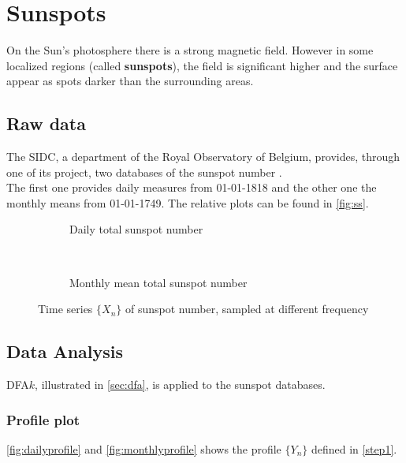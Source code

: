 \graphicspath{{../sunSpots/img/}}
\section{Sunspots}
On the Sun's photosphere there is a strong magnetic field. However in some localized regions (called \textbf{sunspots}), the field is significant higher and the surface appear as spots darker than the surrounding areas.

\subsection{Raw data}
The SIDC, a department of the Royal Observatory of Belgium, provides, through one of its project, two databases of the sunspot number \cite{sidc}. \\
The first one provides daily measures from 01-01-1818 and the other one the monthly means from 01-01-1749. The relative plots can be found in \autoref{fig:ss}.
\begin{figure}[!h]
	\centering
	\begin{subfigure}{0.48\textwidth}
		
		\caption{Daily total sunspot number}\label{fig:dailyss}
	\end{subfigure}
	~
	\begin{subfigure}{0.48\textwidth}
		
		\caption{Monthly mean total sunspot number}\label{fig:monthlyss}
	\end{subfigure}
\caption{Time series $\{X_n\}$ of sunspot number, sampled at different frequency}\label{fig:ss}
\end{figure}

\subsection{Data Analysis}
DFA$k$, illustrated in \autoref{sec:dfa}, is applied to the sunspot databases. 

\subsubsection*{Profile plot}
\autoref{fig:dailyprofile} and \autoref{fig:monthlyprofile} shows the profile $\{Y_n\}$ defined in \autoref{step1}. 

